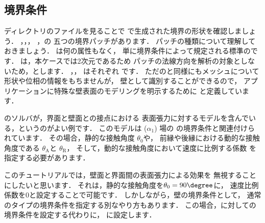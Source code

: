 \subsection{境界条件}
\label{ssec:2.3.2}
ディレクトリのファイルを見ることで
で生成された境界の形状を確認しましょう．
，，，
，の
五つの境界パッチがあります．
パッチの種類について理解しておきましょう．
は何の属性もなく，
単に境界条件によって規定される標準のです．
は，本ケースでは2次元であるため
パッチの法線方向を解析の対象としないため，とします．
，，
はそれぞれ
%
%
です．
ただのと同様にもメッシュについて形状や位相の情報をもちませんが，
壁として識別することができるので，
アプリケーションに特殊な壁表面のモデリングを明示するために
と定義しています．

のソルバが，界面と壁面との接点における
表面張力に対するモデルを含んでいる，というのがよい例です．
このモデルは ($\alpha_{1}$) 場の
%
%
の境界条件と関連付けられています．
その場合，静的な接触角度 $\theta_{0}$や，
前縁や後縁における動的な接触角度である
 $\theta_{\mathrm{A}}$と $\theta_{\mathrm{R}}$，
そして，動的な接触角度において速度に比例する係数
を指定する必要があります．

このチュートリアルでは，壁面と界面間の表面張力による効果を
無視することにしたいと思います．
それは，静的な接触角度を$\theta_{0} = 90\degree$に，
速度比例係数を$0$と設定することで可能です．
しかしながら，壁の境界条件として，
通常のタイプの境界条件を指定する別なやり方もあります．
この場合，に対しての境界条件を設定する代わりに，
に設定します．

